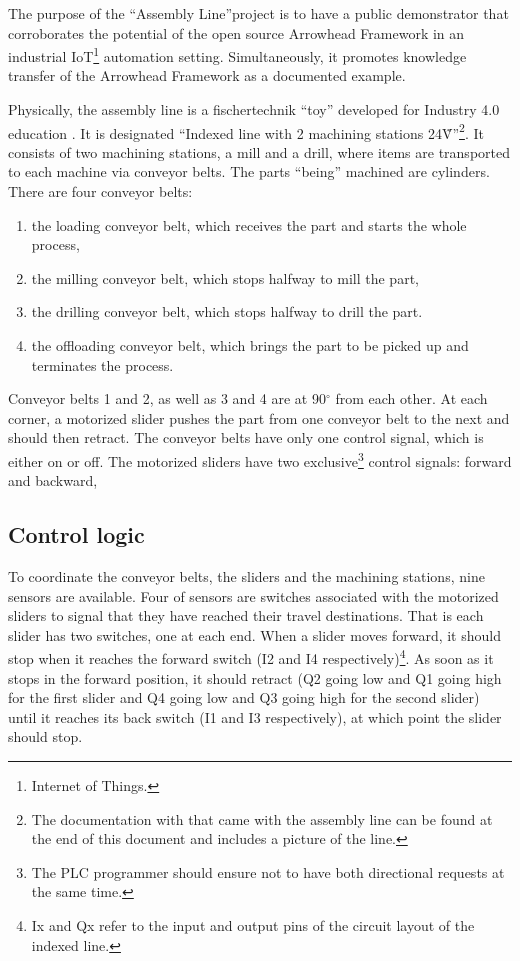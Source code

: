 The purpose of the ``Assembly Line''project is to have a public demonstrator that corroborates the potential of the open source Arrowhead Framework in an industrial IoT\footnote{Internet of Things.} automation setting.
Simultaneously, it  promotes knowledge transfer of the Arrowhead Framework as a documented example.

Physically, the assembly line is a fischertechnik ``toy'' developed for Industry 4.0 education \cite{fischertechnik}.
It is designated ``Indexed line with 2 machining stations 24\~V''\footnote{The documentation with that came with the assembly line can be found at the end of this document and includes a picture of the line.}.
It consists of two machining stations, a mill and a drill, where items are transported to each machine via conveyor belts.
The parts ``being'' machined are cylinders.
There are four conveyor belts:
\begin{enumerate}
 \item the loading conveyor belt, which receives the part and starts the whole process,
 \item the milling conveyor belt, which stops halfway to mill the part,
 \item the drilling conveyor belt, which stops halfway to drill the part.
 \item the offloading conveyor belt, which brings the part to be picked up and terminates the process.
\end{enumerate}
Conveyor belts 1 and 2, as well as 3 and 4 are at 90$^\circ$ from each other.
At each corner, a motorized slider pushes the part from one conveyor belt to the next and should then retract.
The conveyor belts have only one control signal, which is either on or off.
The motorized sliders have two exclusive\footnote{The PLC programmer should ensure not to have both directional requests at the same time.}  control signals: forward and backward,

\subsection{Control logic}

To coordinate the conveyor belts, the sliders and the machining stations, nine sensors are available.
Four of sensors are switches associated with the motorized sliders to signal that they have reached their travel destinations.
That is each slider has two switches, one at each end.
When a slider moves forward, it should stop when it reaches the forward switch (I2 and I4 respectively)\footnote{Ix and Qx refer to the input and output pins of the circuit layout of the indexed line.}.
As soon as it stops in the forward position, it should retract (Q2 going low and Q1 going high for the first slider and Q4 going low and Q3 going high for the second slider) until it reaches its back switch (I1 and I3 respectively), at which point the slider should stop.
 
